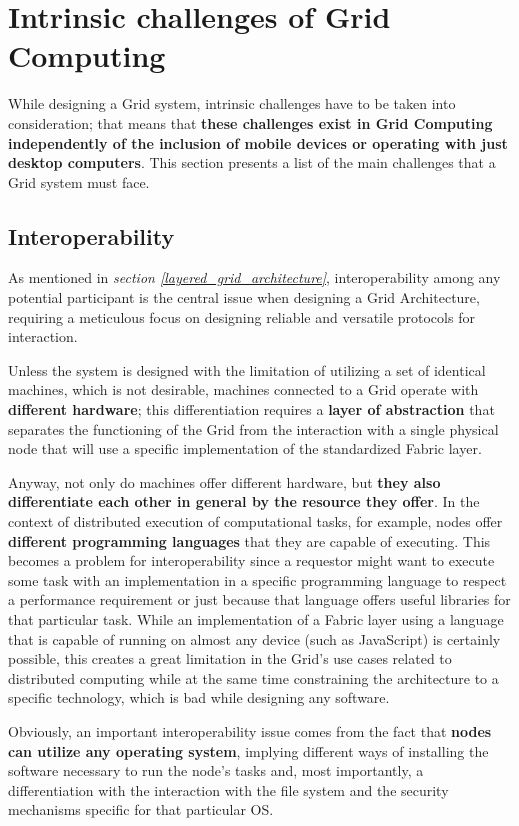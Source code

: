 \section{Intrinsic challenges of Grid Computing}
While designing a Grid system, intrinsic challenges have to be taken into consideration; that means that \textbf{these challenges exist in Grid Computing independently of the inclusion of mobile devices or operating with just desktop computers}. This section presents a list of the main challenges that a Grid system must face.
\vspace{20mm}

\subsection{Interoperability}
As mentioned in \textit{section \ref{layered_grid_architecture}}, interoperability among any potential participant is the central issue when designing a Grid Architecture, requiring a meticulous focus on designing reliable and versatile protocols for interaction.

Unless the system is designed with the limitation of utilizing a set of identical machines, which is not desirable, machines connected to a Grid operate with \textbf{different hardware}; this differentiation requires a \textbf{layer of abstraction} that separates the functioning of the Grid from the interaction with a single physical node that will use a specific implementation of the standardized Fabric layer.

Anyway, not only do machines offer different hardware, but \textbf{they also differentiate each other in general by the resource they offer}. In the context of distributed execution of computational tasks, for example, nodes offer \textbf{different programming languages} that they are capable of executing. This becomes a problem for interoperability since a requestor might want to execute some task with an implementation in a specific programming language to respect a performance requirement or just because that language offers useful libraries for that particular task. While an implementation of a Fabric layer using a language that is capable of running on almost any device (such as JavaScript) is certainly possible, this creates a great limitation in the Grid's use cases related to distributed computing while at the same time constraining the architecture to a specific technology, which is bad while designing any software.

Obviously, an important interoperability issue comes from the fact that \textbf{nodes can utilize any operating system}, implying different ways of installing the software necessary to run the node's tasks and, most importantly, a differentiation with the interaction with the file system and the security mechanisms specific for that particular OS.

